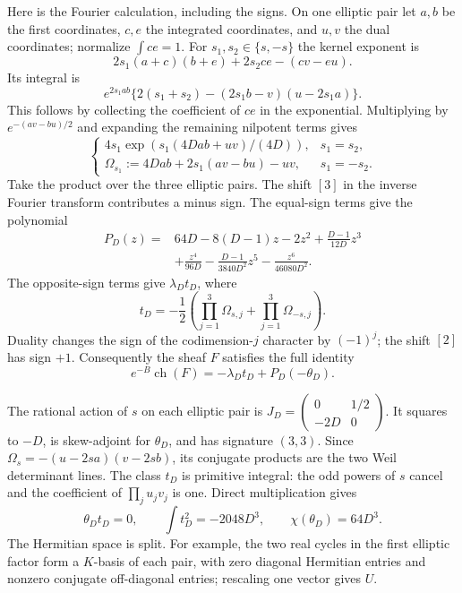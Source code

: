 \documentclass[11pt]{article}
\theoremstyle{definition}
\theoremstyle{remark}
\begin{document}
Here is the Fourier calculation, including the signs. On one elliptic pair let $a,b$ be the first coordinates, $c,e$ the integrated coordinates, and $u,v$ the dual coordinates; normalize $\int ce=1$. For $s_1,s_2\in\{s,-s\}$ the kernel exponent is
\[
 2s_1(a+c)(b+e)+2s_2ce-(cv-eu).
\]
Its integral is
\[
 e^{2s_1ab}\{2(s_1+s_2)-(2s_1b-v)(u-2s_1a)\}.
\]
This follows by collecting the coefficient of $ce$ in the exponential. Multiplying by $e^{-(av-bu)/2}$ and expanding the remaining nilpotent terms gives
\[
 \begin{cases}
 4s_1\exp(s_1(4Dab+uv)/(4D)),&s_1=s_2,\\
 \Omega_{s_1}:=4Dab+2s_1(av-bu)-uv,&s_1=-s_2.
 \end{cases}
\]
Take the product over the three elliptic pairs. The shift $[3]$ in the inverse Fourier transform contributes a minus sign. The equal-sign terms give the polynomial
\begin{equation}\label{eq:effective-polynomial}
 \begin{split}
 P_D(z)={}&64D-8(D-1)z-2z^2+\frac{D-1}{12D}z^3\\
 &+\frac{z^4}{96D}-\frac{D-1}{3840D^2}z^5
       -\frac{z^6}{46080D^2}.
 \end{split}
\end{equation}
The opposite-sign terms give $\lambda_Dt_D$, where
\[
 t_D=-\frac12\left(\prod_{j=1}^3\Omega_{s,j}
                      +\prod_{j=1}^3\Omega_{-s,j}\right).
\]
Duality changes the sign of the codimension-$j$ character by $(-1)^j$; the shift $[2]$ has sign $+1$. Consequently the sheaf $F$ satisfies the full identity
\begin{equation}\label{eq:effective-character}
 e^{-B}\operatorname{ch}(F)=-\lambda_Dt_D+P_D(-\theta_D).
\end{equation}

The rational action of $s$ on each elliptic pair is
$J_D=\left(\begin{smallmatrix}0&1/2\\-2D&0\end{smallmatrix}\right)$.
It squares to $-D$, is skew-adjoint for $\theta_D$, and has signature $(3,3)$. Since
$\Omega_s=-(u-2sa)(v-2sb)$, its conjugate products are the two Weil determinant lines. The class $t_D$ is primitive integral: the odd powers of $s$ cancel and the coefficient of $\prod_j u_jv_j$ is one. Direct multiplication gives
\[
 \theta_Dt_D=0,\qquad \int t_D^2=-2048D^3,
 \qquad \chi(\theta_D)=64D^3.
\]
The Hermitian space is split. For example, the two real cycles in the first elliptic factor form a $K$-basis of each pair, with zero diagonal Hermitian entries and nonzero conjugate off-diagonal entries; rescaling one vector gives $U$.
\end{document}
